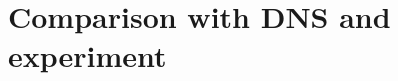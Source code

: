 \documentclass{sintefbeamer}
\begin{document}
    

\section{Comparison with DNS and experiment}
\end{document}

